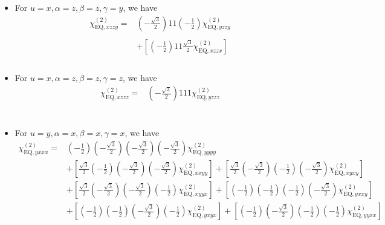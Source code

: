 \documentclass[UTF8,10pt,a4paper]{article}
\begin{document}
\begin{itemize}
\begin{align}
\nonumber&\\
&
\end{align}\normalsize
\item For $u=x,\alpha=z,\beta=z,\gamma=y$, we have
\footnotesize\begin{align}
\nonumber\chi_{\text{EQ},xzzy}^{(2)}=&\left(-\frac{\sqrt{3}}{2}\right)11\left(-\frac{1}{2}\right)\chi_{\text{EQ},yzzy}^{(2)}\\
\nonumber&\\
\nonumber&+\left[\left(-\frac{1}{2}\right)11\frac{\sqrt{3}}{2}\chi_{\text{EQ},xzzx}^{(2)}\right]\\
\nonumber&\\
&
\end{align}\normalsize
\item For $u=x,\alpha=z,\beta=z,\gamma=z$, we have
\footnotesize\begin{align}
\nonumber\chi_{\text{EQ},xzzz}^{(2)}=&\left(-\frac{\sqrt{3}}{2}\right)111\chi_{\text{EQ},yzzz}^{(2)}\\
\nonumber&\\
\nonumber&\\
\nonumber&\\
&
\end{align}\normalsize
\item For $u=y,\alpha=x,\beta=x,\gamma=x$, we have
\footnotesize\begin{align}
\nonumber\chi_{\text{EQ},yxxx}^{(2)}=&\left(-\frac{1}{2}\right)\left(-\frac{\sqrt{3}}{2}\right)\left(-\frac{\sqrt{3}}{2}\right)\left(-\frac{\sqrt{3}}{2}\right)\chi_{\text{EQ},yyyy}^{(2)}\\
\nonumber&+\left[\frac{\sqrt{3}}{2}\left(-\frac{1}{2}\right)\left(-\frac{\sqrt{3}}{2}\right)\left(-\frac{\sqrt{3}}{2}\right)\chi_{\text{EQ},xxyy}^{(2)}\right]+\left[\frac{\sqrt{3}}{2}\left(-\frac{\sqrt{3}}{2}\right)\left(-\frac{1}{2}\right)\left(-\frac{\sqrt{3}}{2}\right)\chi_{\text{EQ},xyxy}^{(2)}\right]\\
\nonumber&+\left[\frac{\sqrt{3}}{2}\left(-\frac{\sqrt{3}}{2}\right)\left(-\frac{\sqrt{3}}{2}\right)\left(-\frac{1}{2}\right)\chi_{\text{EQ},xyyx}^{(2)}\right]+\left[\left(-\frac{1}{2}\right)\left(-\frac{1}{2}\right)\left(-\frac{1}{2}\right)\left(-\frac{\sqrt{3}}{2}\right)\chi_{\text{EQ},yxxy}^{(2)}\right]\\
\nonumber&+\left[\left(-\frac{1}{2}\right)\left(-\frac{1}{2}\right)\left(-\frac{\sqrt{3}}{2}\right)\left(-\frac{1}{2}\right)\chi_{\text{EQ},yxyx}^{(2)}\right]+\left[\left(-\frac{1}{2}\right)\left(-\frac{\sqrt{3}}{2}\right)\left(-\frac{1}{2}\right)\left(-\frac{1}{2}\right)\chi_{\text{EQ},yyxx}^{(2)}\right]\\

\end{align}
\end{itemize}
\end{document}
